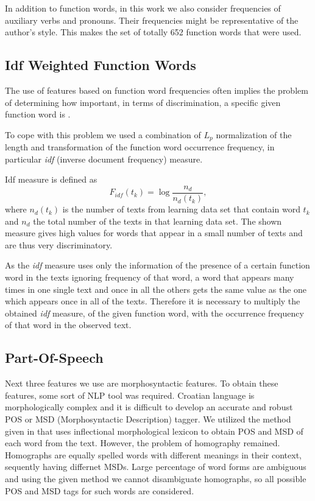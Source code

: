 \documentclass{llncs}
\begin{document}
In addition to function words, in this work we also consider frequencies of
auxiliary verbs and pronouns. Their frequencies might be
representative of the author's style. This makes the set of totally
652 function words that were used.

\subsection{Idf Weighted Function Words}
\label{sec:funkcijske-rijeci-idf}

The use of features based on function word frequencies often implies the
problem of determining how important, in terms of discrimination, a
specific given function word is \cite{diederich2003authorship}.

To cope with this problem we used a combination of $L_p$ normalization of the
length and transformation of the function word occurrence frequency, in
particular \emph{idf} (inverse document frequency) measure.

Idf measure is defined as \cite{diederich2003authorship}
\begin{equation}
F_{idf}(t_k) = \log \frac{n_d}{n_d(t_k)},
\label{equ:idf}
\end{equation}
where $n_d(t_k)$ is the number of texts from learning data set that contain word
$t_k$ and $n_d$ the total number of the texts in that learning data set. The
shown measure gives high values for words that appear in a small number of
texts and are thus very discriminatory.

As the \emph{idf} measure uses only the information of the presence of a
certain function word in the texts ignoring frequency of that word, a word that appears
many times in one single text and once in all the others gets the same value as
the one which appears once in all of the texts. Therefore it is necessary to
multiply the obtained \emph{idf} measure, of the given function word, with the
occurrence frequency of that word in the observed text.

\subsection{Part-Of-Speech}
\label{sec:rijeci-grupe}
Next three features we use are morphosyntactic features. To obtain these
features, some sort of NLP tool was required. Croatian language is
morphologically complex and it is difficult to develop an accurate and robust POS
or MSD (Morphosyntactic Description) tagger. We utilized the method given in
\cite{snajder08automatic} that uses inflectional morphological lexicon to obtain
POS and MSD of each word from the text. However, the problem of homography remained. Homographs are equally spelled words with different meanings in their context, sequently having differnet MSDs. Large percentage of
word forms are ambiguous and using the given method we cannot disambiguate
homographs, so all possible POS and MSD tags for such words are considered.
\end{document}

